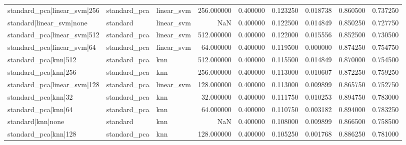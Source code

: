 \begin{tabular}{lllrrrrrr}
standard_pca|linear_svm|256 & standard_pca & linear_svm & 256.000000 & 0.400000 & 0.123250 & 0.018738 & 0.860500 & 0.737250 \\
standard|linear_svm|none & standard & linear_svm & NaN & 0.400000 & 0.122500 & 0.014849 & 0.850250 & 0.727750 \\
standard_pca|linear_svm|512 & standard_pca & linear_svm & 512.000000 & 0.400000 & 0.122000 & 0.015556 & 0.852500 & 0.730500 \\
standard_pca|linear_svm|64 & standard_pca & linear_svm & 64.000000 & 0.400000 & 0.119500 & 0.000000 & 0.874250 & 0.754750 \\
standard_pca|knn|512 & standard_pca & knn & 512.000000 & 0.400000 & 0.115500 & 0.014849 & 0.870000 & 0.754500 \\
standard_pca|knn|256 & standard_pca & knn & 256.000000 & 0.400000 & 0.113000 & 0.010607 & 0.872250 & 0.759250 \\
standard_pca|linear_svm|128 & standard_pca & linear_svm & 128.000000 & 0.400000 & 0.113000 & 0.009899 & 0.865750 & 0.752750 \\
standard_pca|knn|32 & standard_pca & knn & 32.000000 & 0.400000 & 0.111750 & 0.010253 & 0.894750 & 0.783000 \\
standard_pca|knn|64 & standard_pca & knn & 64.000000 & 0.400000 & 0.110750 & 0.003182 & 0.894000 & 0.783250 \\
standard|knn|none & standard & knn & NaN & 0.400000 & 0.108000 & 0.009899 & 0.866500 & 0.758500 \\
standard_pca|knn|128 & standard_pca & knn & 128.000000 & 0.400000 & 0.105250 & 0.001768 & 0.886250 & 0.781000 \\
\bottomrule
\end{tabular}
